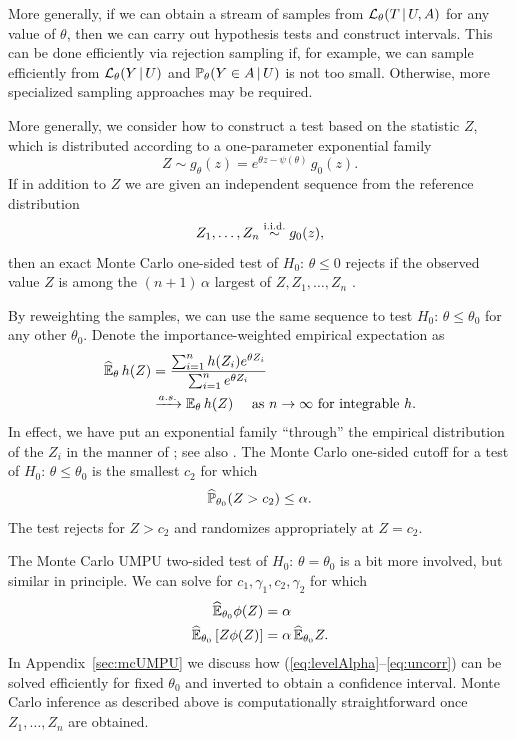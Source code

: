\documentclass{article}
\theoremstyle{definition}
\newcommand{\cL}{\mathcal{L}}
\begin{document}
More generally, if we can obtain a stream of samples from $\cL_\theta(T\gv U, A)$ for any value of $\theta$, then we can carry out hypothesis tests and construct intervals. This can be done efficiently via rejection sampling if, for example, we can sample efficiently from $\cL_\theta(Y\gv U)$ and $\P_\theta(Y \in A \gv U)$ is not too small. Otherwise, more specialized sampling approaches may be required.

More generally, we consider how to construct a test based on the statistic $Z$, which is distributed according to a one-parameter exponential family
\begin{equation}
  Z \sim g_\theta(z) = e^{\theta z - \psi(\theta)}\,g_0(z).
\end{equation}
If in addition to $Z$ we are given an independent sequence
from the reference distribution
\begin{equation}
  Z_1, \ldots, Z_n \simiid g_0(z),
\end{equation}
then an exact Monte Carlo one-sided test of
$H_0:\,\theta\leq 0$ rejects if the observed value $Z$ is
among the $(n+1)\,\alpha$ largest of $Z,Z_1,\ldots,Z_n$ \citep{barnard1963discussion}.

By reweighting the samples, we can use the same sequence to test $H_0:\, \theta\leq \theta_0$ for any other $\theta_0$. Denote the importance-weighted empirical expectation as
\begin{align}
  \widehat \E_\theta \,h(Z) &=
  \frac{\sum_{i=1}^n h(Z_i) e^{\theta Z_i}}
  {\sum_{i=1}^n e^{\theta Z_i}}\\
  &\toAS \E_\theta \,h(Z) \quad \text{ as $n\to\infty$ for integrable } h.
\end{align}
In effect, we have put an exponential family ``through'' the empirical distribution of the $Z_i$ in the manner of \citet{efron1996using}; see also \citet{besag2001markov}. The Monte Carlo one-sided cutoff for a test of $H_0:\, \theta\leq \theta_0$ is the smallest $c_2$ for which
\begin{equation}
  \widehat \P_{\theta_0} (Z> c_2) \leq \alpha.
\end{equation}
The test rejects for $Z>c_2$ and randomizes appropriately at $Z=c_2$.

The Monte Carlo UMPU two-sided test of $H_0:\,
\theta=\theta_0$ is a bit more involved, but similar in principle. We can solve for
$c_1,\gamma_1,c_2,\gamma_2$ for which
\begin{align}\label{eq:levelAlpha}
  \widehat \E_{\theta_0} \phi(Z) &= \alpha\\\label{eq:uncorr}
  \widehat \E_{\theta_0} \left[Z\phi(Z) \right]
  &= \alpha\,\widehat\E_{\theta_0} Z.
\end{align}
In Appendix~\ref{sec:mcUMPU} we discuss how
(\ref{eq:levelAlpha}--\ref{eq:uncorr}) can be solved
efficiently for fixed $\theta_0$ and inverted to obtain a confidence
interval. Monte Carlo inference as described above is computationally
straightforward once $Z_1,\ldots,Z_n$ are obtained.
\end{document}
